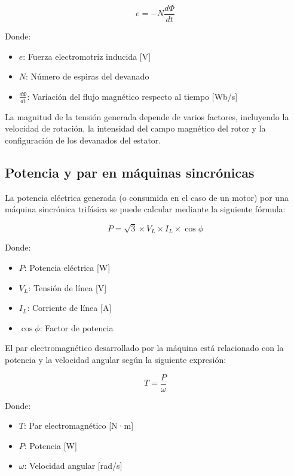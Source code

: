 \documentclass[../main]{subfiles}
\begin{document}
\begin{equation}
e = -N \frac{d\Phi}{dt}
\end{equation}

Donde:
\begin{itemize}
    \item $e$: Fuerza electromotriz inducida [V]
    \item $N$: Número de espiras del devanado
    \item $\frac{d\Phi}{dt}$: Variación del flujo magnético respecto al tiempo [Wb/s]
\end{itemize}

La magnitud de la tensión generada depende de varios factores, incluyendo la velocidad de rotación, la intensidad del campo magnético del rotor y la configuración de los devanados del estator.

\subsection{Potencia y par en máquinas sincrónicas}

La potencia eléctrica generada (o consumida en el caso de un motor) por una máquina sincrónica trifásica se puede calcular mediante la siguiente fórmula:

\begin{equation}
P = \sqrt{3} \times V_L \times I_L \times \cos\phi
\end{equation}

Donde:
\begin{itemize}
    \item $P$: Potencia eléctrica [W]
    \item $V_L$: Tensión de línea [V]
    \item $I_L$: Corriente de línea [A]
    \item $\cos\phi$: Factor de potencia
\end{itemize}

El par electromagnético desarrollado por la máquina está relacionado con la potencia y la velocidad angular según la siguiente expresión:

\begin{equation}
T = \frac{P}{\omega}
\end{equation}

Donde:
\begin{itemize}
    \item $T$: Par electromagnético [N·m]
    \item $P$: Potencia [W]
    \item $\omega$: Velocidad angular [rad/s]
\end{itemize}
\end{document}
